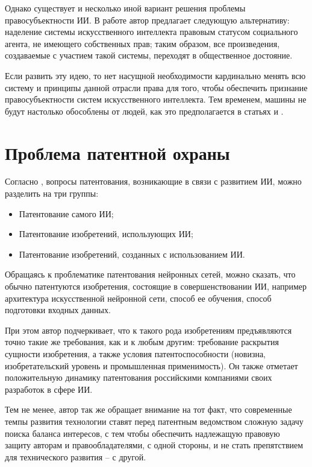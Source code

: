 Однако существует и несколько иной вариант решения проблемы правосубъектности ИИ. В работе
\cite{mor} автор предлагает следующую альтернативу: наделение системы искусственного интеллекта
правовым статусом социального агента, не имеющего собственных прав; таким образом, все произведения,
создаваемые с участием такой системы, переходят в общественное достояние.

Если развить эту идею, то
нет насущной необходимости кардинально менять всю систему и принципы данной отрасли права для того,
чтобы обеспечить признание правосубъектности систем искусственного интеллекта. Тем временем, машины
не будут настолько обособлены от людей, как это предполагается в статьях \cite{chel} и \cite{probs}.

\newpage

\section{Проблема патентной охраны}
Согласно \cite{trans}, вопросы патентования, возникающие в связи с развитием ИИ, можно разделить на три группы:

\begin{itemize}
\item Патентование самого ИИ;
\item Патентование изобретений, использующих ИИ;
\item Патентование изобретений, созданных с использованием ИИ.
\end{itemize}

Обращаясь к проблематике патентования нейронных сетей, можно сказать,
что обычно патентуются изобретения, состоящие в совершенствовании ИИ, например
архитектура искусственной нейронной сети, способ ее обучения, способ подготовки
входных данных.

При этом автор \cite{trans} подчеркивает, что к такого рода изобретениям предъявляются
точно такие же требования, как и к любым другим: требование раскрытия сущности
изобретения, а также условия патентоспособности (новизна, изобретательский уровень
и промышленная применимость). Он также отметает положительную динамику патентования
российскими компаниями своих разработок в сфере ИИ.

Тем не менее, автор так же обращает внимание на тот факт, что современные темпы
развития технологии ставят перед патентным ведомством сложную задачу поиска баланса
интересов, с тем чтобы обеспечить надлежащую правовую защиту авторам и правообладателями,
с одной стороны, и не стать препятствием для технического развития – с другой.

